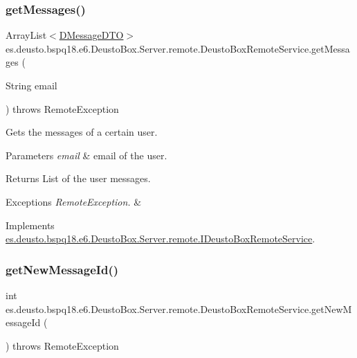 \subsubsection{\texorpdfstring{get\+Messages()}{getMessages()}}
{\footnotesize\ttfamily Array\+List$<$\mbox{\hyperlink{classes_1_1deusto_1_1bspq18_1_1e6_1_1_deusto_box_1_1_server_1_1dto_1_1_d_message_d_t_o}{D\+Message\+D\+TO}}$>$ es.\+deusto.\+bspq18.\+e6.\+Deusto\+Box.\+Server.\+remote.\+Deusto\+Box\+Remote\+Service.\+get\+Messages (\begin{DoxyParamCaption}\item[{String}]{email }\end{DoxyParamCaption}) throws Remote\+Exception}

Gets the messages of a certain user. 
\begin{DoxyParams}{Parameters}
{\em email} & email of the user. \\
\hline
\end{DoxyParams}
\begin{DoxyReturn}{Returns}
List of the user messages. 
\end{DoxyReturn}

\begin{DoxyExceptions}{Exceptions}
{\em Remote\+Exception.} & \\
\hline
\end{DoxyExceptions}


Implements \mbox{\hyperlink{interfacees_1_1deusto_1_1bspq18_1_1e6_1_1_deusto_box_1_1_server_1_1remote_1_1_i_deusto_box_remote_service_a1b7a5ce7fef3acd6e70e0a23bdb38a93}{es.\+deusto.\+bspq18.\+e6.\+Deusto\+Box.\+Server.\+remote.\+I\+Deusto\+Box\+Remote\+Service}}.

\mbox{\label{classes_1_1deusto_1_1bspq18_1_1e6_1_1_deusto_box_1_1_server_1_1remote_1_1_deusto_box_remote_service_ae5002c8513876aae8e9e098e97819696}} 
\subsubsection{\texorpdfstring{get\+New\+Message\+Id()}{getNewMessageId()}}
{\footnotesize\ttfamily int es.\+deusto.\+bspq18.\+e6.\+Deusto\+Box.\+Server.\+remote.\+Deusto\+Box\+Remote\+Service.\+get\+New\+Message\+Id (\begin{DoxyParamCaption}{ }\end{DoxyParamCaption}) throws Remote\+Exception}

